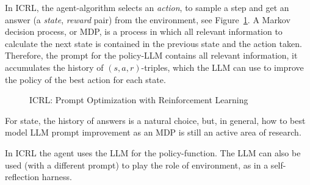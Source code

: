 In ICRL, %
the agent-algorithm selects an {\em action}, to sample a step  and get an answer (a {\em state}, {\em reward} pair) from the environment, see Figure~\ref{fig:rl-icrl}. A Markov decision process, or MDP, is a process in which all relevant information to calculate the next state is contained in the previous state and the action taken. Therefore, the prompt for the policy-LLM contains  all relevant information, it accumulates the history of $(s,a,r)$-triples, which the LLM can use to improve the policy of the best action for each state.
\begin{figure}[t]
  \begin{center}
    
    \caption{ICRL: Prompt Optimization with Reinforcement Learning}\label{fig:rl-icrl}
  \end{center}
\end{figure}
For state, the  history of answers is a natural choice, but, in general, how to best model LLM prompt improvement as an MDP is still an active area of research.

In ICRL the agent uses the LLM for the policy-function. The LLM can also be used (with a different prompt) to play the role of environment, as in a self-reflection harness.

